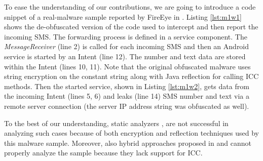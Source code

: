 

\iffalse
\begin{figure}[ht!]
\centering

\caption{SendService}
\label{fig:mlw2}
\end{figure}
\fi



To ease the understanding of our contributions, we are going to introduce a code snippet of a real-malware sample reported by FireEye in \cite{firemalware}. Listing \ref{lst:m1w1} shows the de-obfuscated version of the code used to intercept and then report the incoming SMS. The forwarding process is defined in a service component. The \emph{MessageReceiver} (line 2) is called for each incoming SMS and then an Android service is started by an Intent (line 12). The number and text data are stored within the Intent (lines 10, 11). Note that the original obfuscated malware uses string encryption on the constant string along with Java reflection for calling ICC methods. Then the started service, shown in Listing \ref{lst:m1w2}, gets data from the incoming Intent (lines 5, 6) and leaks (line 14) SMS number and text via a remote server connection (the server IP address string was obfuscated as well).


To the best of our understanding, static analyzers \cite{octeau2013effective,octeau2015composite,li2015iccta,gordon2015information}, are not successful in analyzing such cases because of both encryption and reflection techniques used by this malware sample. Moreover, also hybrid approaches proposed in \cite{rasthofer2016harvesting} and \cite{backes2016r} cannot properly analyze the sample because they lack support for ICC. 





